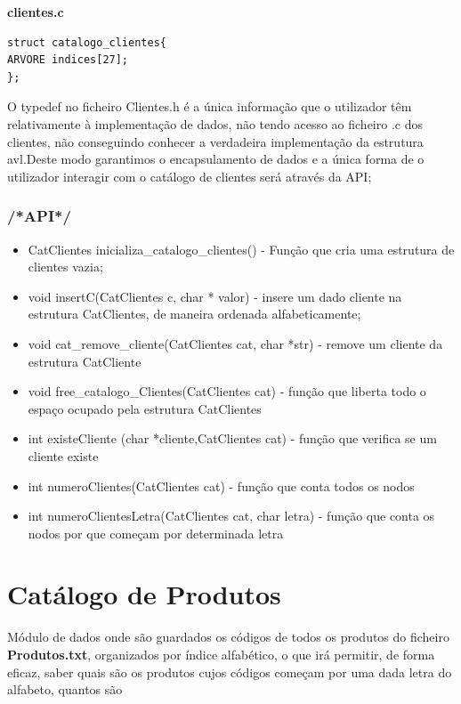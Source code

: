 \textbf{clientes.c}
\begin{verbatim}
struct catalogo_clientes{
ARVORE indices[27];
};
\end{verbatim}

O typedef no ficheiro Clientes.h é a única informação que o utilizador têm relativamente à implementação de dados, não tendo acesso ao ficheiro .c dos clientes, não conseguindo conhecer a verdadeira implementação da estrutura avl.Deste modo garantimos o encapsulamento de dados e a única forma de o utilizador interagir com o catálogo de clientes será através da API; 

\subsubsection{/*API*/}

\begin{itemize}

\item CatClientes inicializa\_catalogo\_clientes() - Função que cria uma estrutura de clientes vazia;

\item void insertC(CatClientes c, char * valor) - insere um dado cliente na estrutura CatClientes, de maneira ordenada alfabeticamente; 

\item void cat\_remove\_cliente(CatClientes cat, char *str) - remove um cliente da estrutura CatCliente 

\item void free\_catalogo\_Clientes(CatClientes cat) - função que liberta todo o espaço ocupado pela estrutura CatClientes

\item int existeCliente (char *cliente,CatClientes cat) - função que verifica se um cliente existe
\item int numeroClientes(CatClientes cat) - função que conta todos os nodos

\item int numeroClientesLetra(CatClientes cat, char letra) - função que conta os nodos por que começam por determinada letra


\end{itemize}

\section{Catálogo de Produtos}

 Módulo de dados onde são guardados os códigos de todos os produtos do ficheiro \textbf{Produtos.txt}, organizados por índice alfabético, o que irá permitir, de forma eficaz, saber quais são os produtos cujos códigos começam por uma dada letra do alfabeto, quantos são



